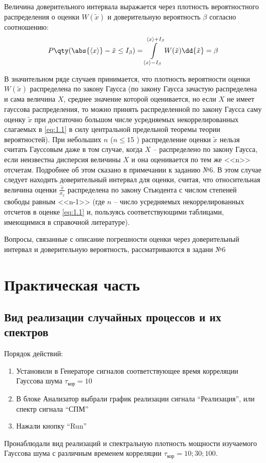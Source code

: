 Величина доверительного интервала выражается через плотность вероятностного распределения о
оценки $W(\tilde x)$ и доверительную вероятность $\beta$ согласно соотношению:
\begin{equation}
\label{eq:5.1}
P\qty(\abs{\mean{x}} - \tilde x \leq I_{\beta}) = \int\limits_{\mean{x}-I_{\beta}}^{\mean{x}+I_{\beta}}  W(\tilde x) \dd{\tilde x} = \beta
\end{equation}

В значительном ряде случаев принимается, что плотность вероятности оценки  $W(\tilde x)$ распределена по закону Гаусса (по закону Гаусса зачастую распределена и сама величина $X$,
среднее значение которой оценивается, но если $X$ не имеет гауссова распределения, то 
можно принять распределенной по закону Гаусса саму оценку $\tilde x$  при достаточно большом числе 
усредняемых некоррелированных слагаемых в \eqref{eq:1.1}  в силу центральной предельной теоремы теории вероятностей).
При небольших $n$ ($n\leq 15$ ) распределение оценки $\tilde x$ нельзя считать 
Гауссовым даже в том случае, когда $X$ -- распределено по закону Гаусса, если 
неизвестна дисперсия величины $X$ и она оценивается по тем же <<n>> отсчетам. 
Подробнее об этом сказано в примечании к заданию №6. 
В этом случае следует находить доверительный интервал для оценки, считая, что относительная величина оценки $\frac{\tilde x}{\sigma_{\tilde x}}$ распределена по
закону Стьюдента с числом степеней свободы равным <<n-1>> (где $n$ -- число 
усредняемых некоррелированных отсчетов в оценке \eqref{eq:1.1}  и, пользуясь соответствующими таблицами, имеющимися в справочной литературе).

Вопросы, связанные с описание погрешности оценки через доверительный интервал и доверительную вероятность, рассматриваются в задани  №6

\section{Практическая часть}
\subsection[Задание 1]{Вид реализации случайных процессов и их спектров}

Порядок действий:
\begin{enumerate}
	\item Установили в Генераторе сигналов соответствующее время корреляции Гауссова шума $\tau_\text{кор} = 10$
	\item В блоке Анализатор выбрали график реализации сигнала “Реализация”, или спектр сигнала “СПМ”
	\item Нажали кнопку “Run”
\end{enumerate}
Пронаблюдали вид реализаций и спектральную плотность мощности изучаемого Гауссова шума с различным временем корреляции $\tau_\text{кор} =10; 30; 100$.

